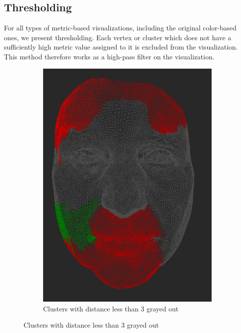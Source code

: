 \subsection{Thresholding}

For all types of metric-based visualizations, including the original color-based ones, we present thresholding. Each vertex or cluster which does not have a sufficiently high metric value assigned to it is excluded from the visualization. This method therefore works as a high-pass filter on the visualization.

\begin{figure}[h]
\centering
	\begin{subfigure}{0.3\textwidth}
	\includegraphics[width=\textwidth]{./img/meshdiff-thresholding-clustercolor-length3.PNG}
    \caption{Clusters with distance less than 3 grayed out}
    \label{fig:meshdiff_thresholding_clustercolor}
	\end{subfigure}

\end{figure}
